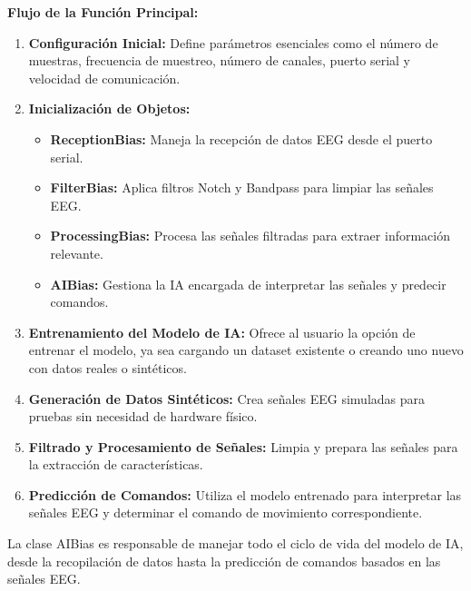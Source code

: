 \documentclass{article}
\begin{document}
\textbf{Flujo de la Función Principal:}
\begin{enumerate}
    \item \textbf{Configuración Inicial:} Define parámetros esenciales como el número de muestras, frecuencia de muestreo, número de canales, puerto serial y velocidad de comunicación.
    \item \textbf{Inicialización de Objetos:}
    \begin{itemize}
        \item \textbf{ReceptionBias:} Maneja la recepción de datos EEG desde el puerto serial.
        \item \textbf{FilterBias:} Aplica filtros Notch y Bandpass para limpiar las señales EEG.
        \item \textbf{ProcessingBias:} Procesa las señales filtradas para extraer información relevante.
        \item \textbf{AIBias:} Gestiona la IA encargada de interpretar las señales y predecir comandos.
    \end{itemize}
    \item \textbf{Entrenamiento del Modelo de IA:} Ofrece al usuario la opción de entrenar el modelo, ya sea cargando un dataset existente o creando uno nuevo con datos reales o sintéticos.
    \item \textbf{Generación de Datos Sintéticos:} Crea señales EEG simuladas para pruebas sin necesidad de hardware físico.
    \item \textbf{Filtrado y Procesamiento de Señales:} Limpia y prepara las señales para la extracción de características.
    \item \textbf{Predicción de Comandos:} Utiliza el modelo entrenado para interpretar las señales EEG y determinar el comando de movimiento correspondiente.
\end{enumerate}

La clase AIBias es responsable de manejar todo el ciclo de vida del modelo de IA, desde la recopilación de datos hasta la predicción de comandos basados en las señales EEG.
\end{document}
